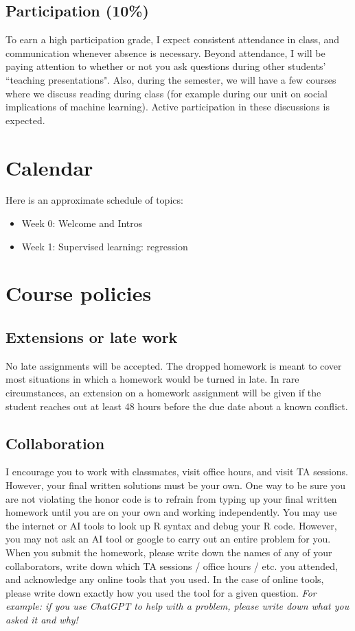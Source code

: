 \documentclass[11pt]{article}
\begin{document}
\subsection{Participation (10\%)}

To earn a high participation grade, I expect consistent attendance in class, and communication whenever absence is necessary. Beyond attendance, I will be paying attention to whether or not you ask questions during other students' ``teaching presentations". Also, during the semester, we will have a few courses where we discuss reading during class (for example during our unit on social implications of machine learning). Active participation in these discussions is expected. 

\section{Calendar}

Here is an approximate schedule of topics:
\begin{itemize}
\item Week 0: Welcome and Intros
\item Week 1: Supervised learning: regression
\end{itemize}


 


\section{Course policies}

\subsection{Extensions or late work}

No late assignments will be accepted. The dropped homework is meant to cover most situations in which a homework would be turned in late. In rare circumstances, an extension on a homework assignment will be given if the student reaches out at least 48 hours before the due date about a known conflict.

\subsection{Collaboration}

I encourage you to work with classmates, visit office hours, and visit TA sessions. However, your final written solutions must be your own. One way to be sure you are not violating the honor code is to refrain from typing up your final written homework until you are on your own and working independently. You may use the internet or AI tools to look up R syntax and debug your R code. However, you may not ask an AI tool or google to carry out an entire problem for you. When you submit the homework, please write down the names of any of your collaborators, write down which TA sessions / office hours / etc. you attended, and acknowledge any online tools that you used. In the case of online tools, please write down exactly how you used the tool for a given question. \emph{For example: if you use ChatGPT to help with a problem, please write down what you asked it and why!}  
\end{document}
